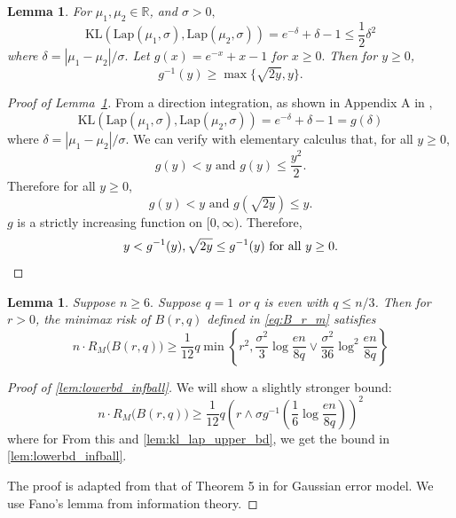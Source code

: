 \documentclass[ejs,noshowframe]{imsart}
\theoremstyle{plain}
\newtheorem{lemma}[theorem]{Lemma}
\theoremstyle{definition}
\newcommand{\R}{\mathbb{R}}
\newcommand{\lap}{\mathrm{Lap}}
\newcommand{\kl}{\mathrm{KL}}
\begin{document}
\begin{appendix}
\begin{lemma}
\label{lem:kl_lap_upper_bd}
For $\mu_1, \mu_2 \in \R$, and $\sigma > 0,$
$$
\kl( \lap(\mu_1, \sigma), \lap(\mu_2, \sigma)) =  e^{-\delta} + \delta - 1 \leq 
\frac 12 \delta^2
$$
where $\delta = |\mu_1 - \mu_2|/\sigma.$
Let $g(x) = e^{-x} + x - 1$ for $x\ge 0.$ Then for $y\geq 0$, 
$$
g^{-1}(y) \geq \max\{ \sqrt{2y}, y\}.
$$

\end{lemma}
\begin{proof}[Proof of Lemma~\ref{lem:kl_lap_upper_bd}]
From a direction integration, as shown in Appendix A in 
\cite{meyer2021alternative}, 
$$
\kl( \lap(\mu_1, \sigma), \lap(\mu_2, \sigma)) = e^{-\delta} + \delta - 1 = 
g(\delta)
$$
where $\delta = |\mu_1-\mu_2|/\sigma$.
We can verify with elementary calculus that, for all $y\ge 0$, 
$$g(y) < y \text{ and } g(y) \leq \frac{y^2}{2}.$$ 
Therefore for all $y\ge 0$, 
$$
g(y) < y \text{ and } g(\sqrt{2y}) \leq y.
$$
$g$ is a strictly increasing function on $[0,\infty).$
Therefore,
\[
y < g^{-1}(y), \sqrt{2y} \leq g^{-1}(y) \text{ for all } y\ge 0. \qedhere
\]
\end{proof}


\begin{lemma}
\label{lem:lowerbd_infball}
Suppose $n\ge 6.$ Suppose  $q=1$ or  $q$ is even with $q \leq n/3$. Then for 
$r>0$, the minimax risk of $B(r, q)$ defined in \eqref{eq:B_r_m} satisfies
\begin{equation}
n \cdot R_M \big( B(r, q) \big) \geq
 \frac{1}{12} q \min\left\{ r^2, \frac{\sigma^2}{3} \log \frac{en}{8q} \vee  
\frac{\sigma^2}{36} \log^2 \frac{en}{8q}
						\right\}
\end{equation}
\end{lemma}

\begin{proof}[Proof of \autoref{lem:lowerbd_infball}]
We will show a slightly stronger bound:
\begin{equation}
		n \cdot R_M \big( B(r, q) \big) \geq
		\frac{1}{12} q \left( r\wedge \sigma g^{-1} \left( \frac{1}{6} \log 
		\frac{en}{8q}  \right) 
		\right)^2
	\end{equation}
	where  for 
From this and \autoref{lem:kl_lap_upper_bd}, we get the  bound in 
\autoref{lem:lowerbd_infball}.

	
	The proof is adapted from that of 
	Theorem 5 in \cite{birge2001gaussian} for Gaussian error model.
	We use Fano's lemma from information theory.
	

\end{proof}
\end{appendix}
\end{document}
